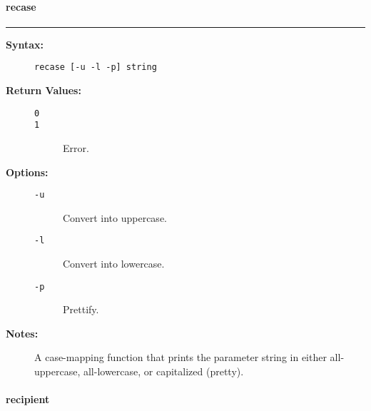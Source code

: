 \vspace {2pt}


\paragraph{recase}

\hrule
\begin{description}
\item[{\bf Syntax:}] \mbox{}

{\tt recase [-u {\verbar} -l {\verbar} -p] string}

\item[{\bf Return Values:}] \mbox{}

\begin{description}
\item[{\tt 0}] \mbox{}



\item[{\tt 1}] \mbox{}

Error.

\end{description}


\item[{\bf Options:}] \mbox{}

\begin{description}
\item[{\tt -u}] \mbox{}

Convert into uppercase.

\item[{\tt -l}] \mbox{}

Convert into lowercase.

\item[{\tt -p}] \mbox{}

Prettify.

\end{description}


\item[{\bf Notes:}] \mbox{}

A case-mapping function that prints the parameter 
string in either all-uppercase, all-lowercase, or capitalized (pretty).

\end{description}


\vspace {2pt}


\paragraph{recipient}


